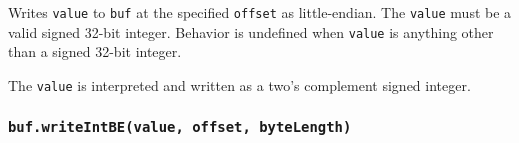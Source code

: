 Writes \texttt{value} to \texttt{buf} at the specified \texttt{offset}
as little-endian. The \texttt{value} must be a valid signed 32-bit
integer. Behavior is undefined when \texttt{value} is anything other
than a signed 32-bit integer.

The \texttt{value} is interpreted and written as a two's complement
signed integer.

\begin{Shaded}
\begin{Highlighting}[]
\NormalTok{ \{ }\NormalTok{ \} } \OperatorTok{;}

\OperatorTok{=} \NormalTok{(}\NormalTok{)}\OperatorTok{;}

\NormalTok{(}\OperatorTok{,} \NormalTok{)}\OperatorTok{;}

\OperatorTok{;}
\end{Highlighting}
\end{Shaded}

\begin{Shaded}
\begin{Highlighting}[]
\NormalTok{ \{ }\NormalTok{ \} }\OperatorTok{=} \NormalTok{(}\NormalTok{)}\OperatorTok{;}

\OperatorTok{=} \NormalTok{(}\NormalTok{)}\OperatorTok{;}

\NormalTok{(}\OperatorTok{,} \NormalTok{)}\OperatorTok{;}

\OperatorTok{;}
\end{Highlighting}
\end{Shaded}

\subsubsection{\texorpdfstring{\texttt{buf.writeIntBE(value,\ offset,\ byteLength)}}{buf.writeIntBE(value, offset, byteLength)}}\label{buf.writeintbevalue-offset-bytelength}

